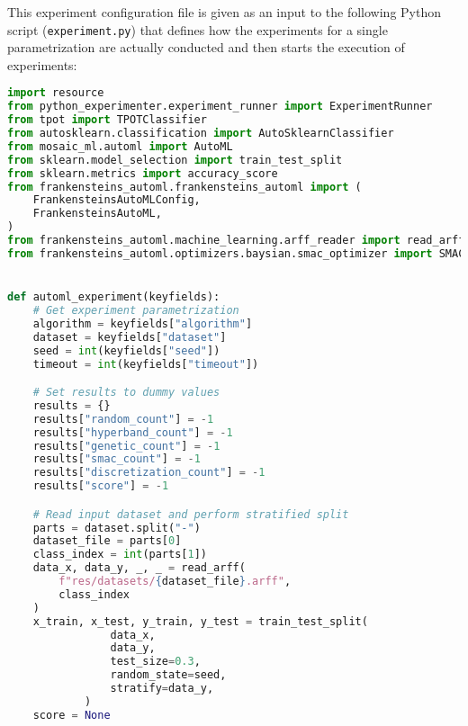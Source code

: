 This experiment configuration file is given as an input to the following Python script (\texttt{experiment.py}) that defines how the experiments for a single parametrization are actually conducted and then starts the execution of experiments:
\begin{lstlisting}[language=Python,basicstyle=\scriptsize]
import resource
from python_experimenter.experiment_runner import ExperimentRunner
from tpot import TPOTClassifier
from autosklearn.classification import AutoSklearnClassifier
from mosaic_ml.automl import AutoML
from sklearn.model_selection import train_test_split
from sklearn.metrics import accuracy_score
from frankensteins_automl.frankensteins_automl import (
    FrankensteinsAutoMLConfig,
    FrankensteinsAutoML,
)
from frankensteins_automl.machine_learning.arff_reader import read_arff
from frankensteins_automl.optimizers.baysian.smac_optimizer import SMAC


def automl_experiment(keyfields):
    # Get experiment parametrization
    algorithm = keyfields["algorithm"]
    dataset = keyfields["dataset"]
    seed = int(keyfields["seed"])
    timeout = int(keyfields["timeout"])

    # Set results to dummy values
    results = {}
    results["random_count"] = -1
    results["hyperband_count"] = -1
    results["genetic_count"] = -1
    results["smac_count"] = -1
    results["discretization_count"] = -1
    results["score"] = -1

    # Read input dataset and perform stratified split
    parts = dataset.split("-")
    dataset_file = parts[0]
    class_index = int(parts[1])
    data_x, data_y, _, _ = read_arff(
        f"res/datasets/{dataset_file}.arff",
        class_index 
    )
    x_train, x_test, y_train, y_test = train_test_split(
                data_x,
                data_y,
                test_size=0.3,
                random_state=seed,
                stratify=data_y,
            )
    score = None


\end{lstlisting}
